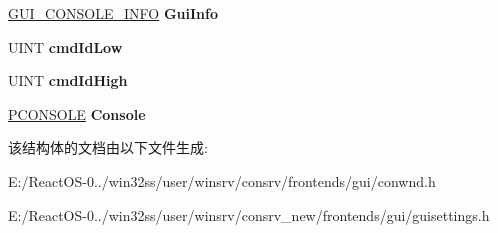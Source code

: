 \begin{DoxyCompactItemize}
\hyperlink{struct___g_u_i___c_o_n_s_o_l_e___i_n_f_o}{G\+U\+I\+\_\+\+C\+O\+N\+S\+O\+L\+E\+\_\+\+I\+N\+FO} {\bfseries Gui\+Info}
\item 
\mbox{\label{struct___g_u_i___c_o_n_s_o_l_e___d_a_t_a_a7cd941fc11d39e1745bc880d1f844673}} 
U\+I\+NT {\bfseries cmd\+Id\+Low}
\item 
\mbox{\label{struct___g_u_i___c_o_n_s_o_l_e___d_a_t_a_aff92fbd3f67f23a3771e85bb0ae81839}} 
U\+I\+NT {\bfseries cmd\+Id\+High}
\item 
\mbox{\label{struct___g_u_i___c_o_n_s_o_l_e___d_a_t_a_a8a3efa482a03fd48ac8a7c3b97628224}} 
\hyperlink{struct___c_o_n_s_o_l_e}{P\+C\+O\+N\+S\+O\+LE} {\bfseries Console}
\end{DoxyCompactItemize}


该结构体的文档由以下文件生成\+:\begin{DoxyCompactItemize}
\item 
E\+:/\+React\+O\+S-\/0../win32ss/user/winsrv/consrv/frontends/gui/conwnd.\+h\item 
E\+:/\+React\+O\+S-\/0../win32ss/user/winsrv/consrv\+\_\+new/frontends/gui/guisettings.\+h\end{DoxyCompactItemize}
